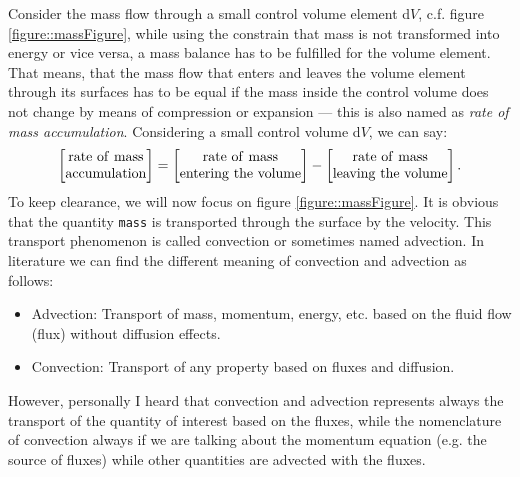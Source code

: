 	Consider the mass flow through a small control volume element d$V$, c.f.
    figure \ref{figure::massFigure}, while using the constrain that mass is
    not transformed into energy or vice versa, a mass balance has to be
    fulfilled for the volume element. That means, that the mass flow that enters
    and leaves the volume element through its surfaces has to be equal if the
    mass inside the control volume does not change by means of compression or
    expansion --- this is also named as \textit{rate of mass accumulation}.
    Considering a small control volume d$V$, we can say:
%
%
\begin{equation}
\left[
 \begin{matrix}
  \mathrm{rate~of~mass}\\
  \mathrm{accumulation}
 \end{matrix}
\right]
=
\left[
 \begin{matrix}
  \mathrm{rate~of~mass}\\
  \mathrm{entering~the~volume}
 \end{matrix}
\right]
-
\left[
 \begin{matrix}
  \mathrm{rate~of~mass}\\
  \mathrm{leaving~the~volume}
 \end{matrix}
\right].
\label{equation::massWord}
\end{equation}
%
%
	To keep clearance, we will now focus on figure \ref{figure::massFigure}.
    It is obvious that the quantity \texttt{mass} is transported through the
    surface by the velocity. This transport phenomenon is called convection or
    sometimes named advection. In literature we can find the different meaning
    of convection and advection as follows:
%
%
\begin{itemize}
 \item Advection: Transport of mass, momentum, energy, etc. based on the fluid
       flow (flux) without diffusion effects.
 \item Convection: Transport of any property based on fluxes and diffusion.
\end{itemize}
%
%
    However, personally I heard that convection and advection represents
    always the transport of the quantity of interest based on the fluxes,
    while the nomenclature of convection always if we are talking about the
    momentum equation (e.g. the source of fluxes) while other quantities are
    advected with the fluxes.

